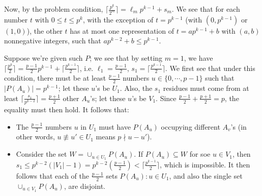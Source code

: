 \documentclass[11pt,a4paper]{article}
\begin{document}
\begin{enumerate}
        Now, by the problem condition, 
        $\lceil \frac{p^k}{2^m}\rceil = \ell_mp^{k-1} + s_m$. 
        We see that for each number $t$ with $0\le t\le p^k$, with the exception of 
        $t = p^{k-1}$ (with $(0, p^{k-1})$ or $(1, 0)$), 
        the other $t$ has at most one representation of $t = ap^{k-1}+b$ with $(a, b)$ nonnegative integers,
        such that $ap^{k-2}+b\le p^{k-1}$. 
        
        Suppose we're given such $P$; we see that by setting $m=1$, we have $\lceil \frac{p^k}{2}\rceil
        =\frac{p-1}{2}p^{k-1} + \lceil \frac{p^{k-1}}{2}\rceil
        $, i.e. $\ell_1 = \frac{p-1}{2}$, $s_1 = \lceil \frac{p^{k-1}}{2}\rceil$. 
        We first see that under this condition, 
        there must be at least $\frac{p-1}{2}$ numbers $u\in \{0, \cdots, p-1\}$ such that 
        $|P(A_u)| = p^{k-1}$; let these $u$'s be $U_1$. 
        Also, the $s_1$ residues must come from at least 
        $\lceil \frac{s_1}{p^{k-2}}\rceil = \frac{p+1}{2}$ other $A_u$'s; 
        let these $u$'s be $V_1$. 
        Since $\frac{p-1}{2} + \frac{p+1}{2} = p$, the equality must then hold. 
        It follows that: 
        \begin{itemize}
        	\item The $\frac{p-1}{2}$ numbers $u$ in $U_1$ must have $P(A_u)$ occupying different $A_v$'s 
        	(in other words, $u\not\equiv u'\in U_1$ means $p\nmid u-u'$). 
        	
        	\item Consider the set $W=\cup_{u\in U_1} P(A_u)$. 
        	If $P(A_u)\subseteq W$ for soe $u\in V_1$, 
        	then $s_1\le p^{k-2}(|V_1|-1)=p^{k-2}(\frac{p-1}{2}) < \lceil \frac{p^{k-1}}{2}\rceil$, 
        	which is impossible. 
        	It then follows that 
        	each of the $\frac{p-1}{2}$ sets $P(A_u): u\in U_1$, and also the single set $\cup_{u\in V_1} P(A_u)$, are disjoint. 
        \end{itemize}
        

\end{enumerate}
\end{document}
